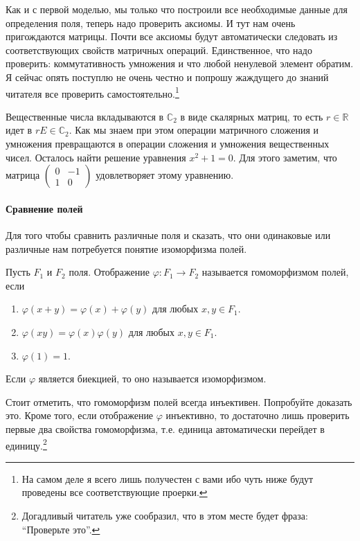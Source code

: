 Как и с первой моделью, мы только что построили все необходимые данные для определения поля, теперь надо проверить аксиомы. И тут нам очень пригождаются матрицы. Почти все аксиомы будут автоматически следовать из соответствующих свойств матричных операций. Единственное, что надо проверить: коммутативность умножения и что любой ненулевой элемент обратим. Я сейчас опять поступлю не очень честно и попрошу жаждущего до знаний читателя все проверить самостоятельно.\footnote{На самом деле я всего лишь получестен с вами ибо чуть ниже будут проведены все соответствующие проерки.}

Вещественные числа вкладываются в $\mathbb C_2$ в виде скалярных матриц, то есть $r\in\mathbb R$ идет в $rE\in\mathbb C_2$. Как мы знаем при этом операции матричного сложения и умножения превращаются в операции сложения и умножения вещественных чисел. Осталось найти решение уравнения $x^2+1 = 0$. Для этого заметим, что матрица $\left(\begin{smallmatrix}{0}&{-1}\\{1}&{0}\end{smallmatrix}\right)$ удовлетворяет этому уравнению.

\paragraph{Сравнение полей} Для того чтобы сравнить различные поля и сказать, что они одинаковые или различные нам потребуется понятие изоморфизма полей.

\begin{definition}
Пусть $F_1$ и $F_2$ поля. Отображение $\varphi\colon F_1\to F_2$ называется гомоморфизмом полей, если 
\begin{enumerate}
\item $\varphi(x+y) = \varphi(x) + \varphi(y)$ для любых $x,y\in F_1$.
\item $\varphi(xy) = \varphi(x)\varphi(y)$ для любых $x,y\in F_1$.
\item $\varphi(1) = 1$.
\end{enumerate}
Если $\varphi$ является биекцией, то оно называется изоморфизмом.
\end{definition}

Стоит отметить, что гомоморфизм полей всегда инъективен. Попробуйте доказать это. Кроме того, если отображение $\varphi$ инъективно, то достаточно лишь проверить первые два свойства гомоморфизма, т.е. единица автоматически перейдет в единицу.\footnote{Догадливый читатель уже сообразил, что в этом месте будет фраза: ``Проверьте это''.}

